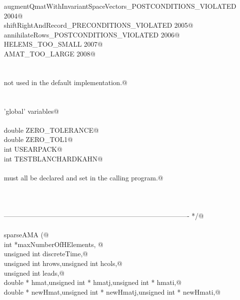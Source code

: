 \documentclass[12pt]{article}
\begin{document}
\begin{flushleft}
\begin{minipage}{\linewidth}
\begin{list}{}{}
\mbox{}\verb@                augmentQmatWithInvariantSpaceVectors_POSTCONDITIONS_VIOLATED 2004@\\
\mbox{}\verb@                shiftRightAndRecord_PRECONDITIONS_VIOLATED 2005@\\
\mbox{}\verb@                annihilateRows_POSTCONDITIONS_VIOLATED 2006@\\
\mbox{}\verb@                HELEMS_TOO_SMALL 2007@\\
\mbox{}\verb@                AMAT_TOO_LARGE 2008@\\
\mbox{}\verb@@\\
\mbox{}\verb@@\\
\mbox{}\verb@                not used in the default implementation.@\\
\mbox{}\verb@@\\
\mbox{}\verb@@\\
\mbox{}\verb@        'global' variables@\\
\mbox{}\verb@@\\
\mbox{}\verb@                double ZERO_TOLERANCE@\\
\mbox{}\verb@                double ZERO_TOL1@\\
\mbox{}\verb@                int USEARPACK@\\
\mbox{}\verb@                int TESTBLANCHARDKAHN@\\
\mbox{}\verb@@\\
\mbox{}\verb@        must all be declared and set in the calling program.@\\
\mbox{}\verb@@\\
\mbox{}\verb@@\\
\mbox{}\verb@@\\
\mbox{}\verb@---------------------------------------------------------------------------------- */@\\
\mbox{}\verb@@\\
\mbox{}\verb@void sparseAMA (@\\
\mbox{}\verb@unsigned int *maxNumberOfHElements,             @\\
\mbox{}\verb@    unsigned int discreteTime,@\\
\mbox{}\verb@    unsigned int hrows,unsigned int hcols,@\\
\mbox{}\verb@    unsigned int leads,@\\
\mbox{}\verb@    double * hmat,unsigned int * hmatj,unsigned int * hmati,@\\
\mbox{}\verb@    double * newHmat,unsigned int * newHmatj,unsigned int * newHmati,@\\

\end{list}
\end{minipage}
\end{flushleft}
\end{document}
